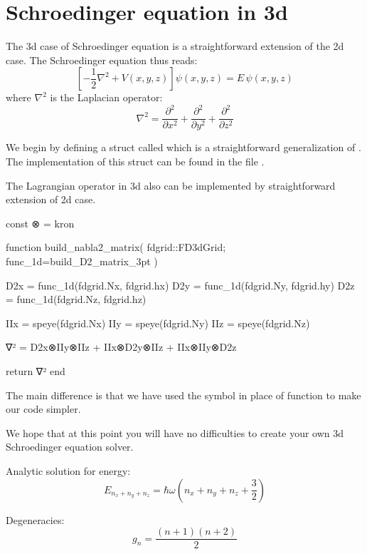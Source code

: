 \section{Schroedinger equation in 3d}

The 3d case of Schroedinger equation is a straightforward extension of the 2d case.
The Schroedinger equation thus reads:
\begin{equation}
\left[ -\frac{1}{2}\nabla^2 + V(x,y,z) \right] \psi(x,y,z) = E\,\psi(x,y,z)
\label{eq:sch_3d}
\end{equation}
%
where $\nabla^2$ is the Laplacian operator:
\begin{equation}
\nabla^2 = \frac{\partial^2}{\partial x^2} + \frac{\partial^2}{\partial y^2} + \frac{\partial^2}{\partial z^2}
\end{equation}

We begin by defining a struct called  which is a
straightforward generalization of . The implementation of this
struct can be found in the file .

The Lagrangian operator in 3d also can be implemented by straightforward extension
of 2d case.
\begin{juliacode}
const ⊗ = kron

function build_nabla2_matrix( fdgrid::FD3dGrid; func_1d=build_D2_matrix_3pt )

    D2x = func_1d(fdgrid.Nx, fdgrid.hx)
    D2y = func_1d(fdgrid.Ny, fdgrid.hy)
    D2z = func_1d(fdgrid.Nz, fdgrid.hz)

    IIx = speye(fdgrid.Nx)
    IIy = speye(fdgrid.Ny)
    IIz = speye(fdgrid.Nz)

    ∇² = D2x⊗IIy⊗IIz + IIx⊗D2y⊗IIz + IIx⊗IIy⊗D2z 

    return ∇²
end
\end{juliacode}

The main difference is that we have used the symbol  in place
of  function to make our code simpler.

We hope that at this point you will have no difficulties to create your own
3d Schroedinger equation solver.

Analytic solution for energy:
\begin{equation}
E_{n_{x} + n_{y} + n_{z}} = \hbar \omega \left( n_{x} + n_{y} + n_{z} + \frac{3}{2} \right)
\end{equation}

Degeneracies:
\begin{equation}
g_{n} = \frac{(n + 1)(n + 2)}{2}
\end{equation}

